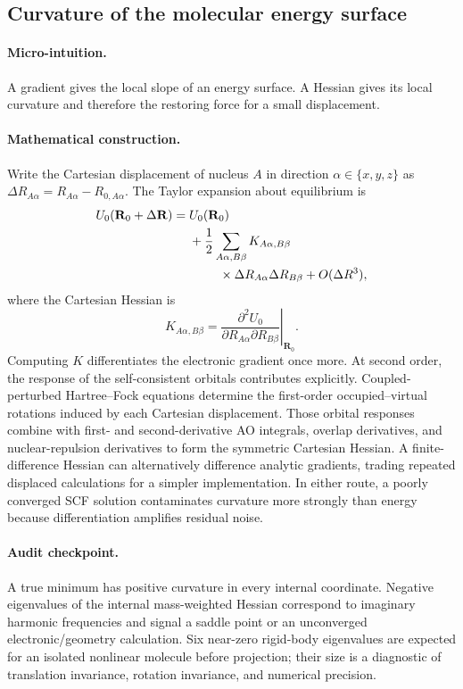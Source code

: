 \documentclass[10pt,twocolumn]{article}
\newcommand{\micro}{\paragraph{Micro-intuition.}}
\newcommand{\mathderiv}{\paragraph{Mathematical construction.}}
\newcommand{\audit}{\paragraph{Audit checkpoint.}}
\begin{document}
\subsection*{Curvature of the molecular energy surface}

\micro A gradient gives the local slope of an energy surface.  A Hessian gives
its local curvature and therefore the restoring force for a small displacement.

\mathderiv Write the Cartesian displacement of nucleus $A$ in direction
$\alpha\in\{x,y,z\}$ as $\Delta R_{A\alpha}=R_{A\alpha}-R_{0,A\alpha}$.
The Taylor expansion about equilibrium is
\begin{align}
U_0(\mathbf R_0+\Delta\mathbf R)
={}&U_0(\mathbf R_0)\nonumber\\
&+\frac12\sum_{A\alpha,B\beta}
K_{A\alpha,B\beta}\nonumber\\
&\hspace{2.4em}\times\Delta R_{A\alpha}\Delta R_{B\beta}
+O(\Delta R^3),
\label{eq:hessian-expansion}
\end{align}
where the Cartesian Hessian is
\begin{equation}
K_{A\alpha,B\beta}=
\left.\frac{\partial^2U_0}
{\partial R_{A\alpha}\partial R_{B\beta}}\right|_{\mathbf R_0}.
\label{eq:cart-hessian}
\end{equation}
Computing $K$ differentiates the electronic gradient once more.  At second
order, the response of the self-consistent orbitals contributes explicitly.
Coupled-perturbed Hartree--Fock equations determine the first-order
occupied--virtual rotations induced by each Cartesian displacement.  Those
orbital responses combine with first- and second-derivative AO integrals,
overlap derivatives, and nuclear-repulsion derivatives to form the symmetric
Cartesian Hessian.  A finite-difference Hessian can alternatively difference
analytic gradients, trading repeated displaced calculations for a simpler
implementation.  In either route, a poorly converged SCF solution contaminates
curvature more strongly than energy because differentiation amplifies residual
noise.

\audit A true minimum has positive curvature in every internal coordinate.
Negative eigenvalues of the internal mass-weighted Hessian correspond to
imaginary harmonic frequencies and signal a saddle point or an unconverged
electronic/geometry calculation.  Six near-zero rigid-body eigenvalues are
expected for an isolated nonlinear molecule before projection; their size is a
diagnostic of translation invariance, rotation invariance, and numerical
precision.
\end{document}
